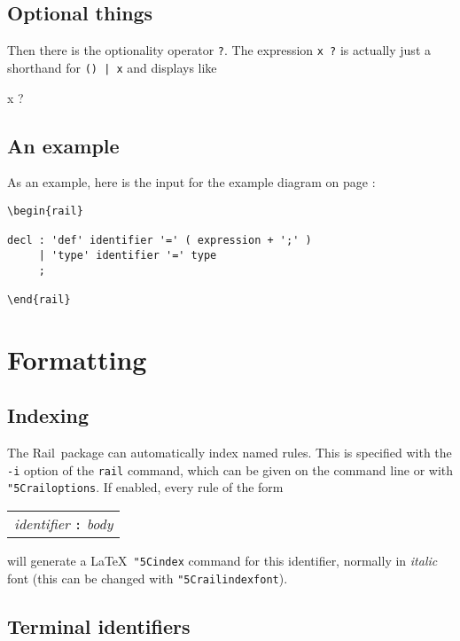 \documentclass[a4paper]{article}
\newcommand\Rail{Rail}
\newcommand\nt[1]{\textit{#1}}
\newcommand\lit[1]{\texttt{#1}}
\newcommand\cs[1]{\lit{\char"5C\relax#1}}
\newenvironment{example}%
{\begin{trivlist}\item[]\begin{tabular}{l}}%
{\end{tabular}\end{trivlist}}
\begin{document}
\subsection{Optional things}

Then there is the optionality operator \verb!?!. The expression
\verb!x ?! is actually just a shorthand for \verb!() | x! and displays
like
\begin{rail}
x ?
\end{rail}

\subsection{An example}

As an example, here is the input for the example diagram on page
\pageref{example}:
\begin{verbatim}
\begin{rail}

decl : 'def' identifier '=' ( expression + ';' )
     | 'type' identifier '=' type
     ;

\end{rail}
\end{verbatim}

\section{Formatting}

\subsection{Indexing}

The \Rail\ package can automatically index named rules. This is
specified with the \lit{-i} option of the \lit{rail} command, which can be
given on the command line or with \cs{railoptions}. If enabled,
every rule of the form
\begin{example}
\nt{identifier} \lit{:} \nt{body}
\end{example}
will generate a \LaTeX\ \cs{index} command for this identifier, normally
in \textit{italic} font (this can be changed with \cs{railindexfont}).

\subsection{Terminal identifiers}
\end{document}
